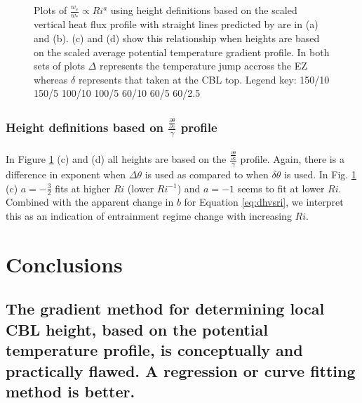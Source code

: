 \documentclass[referee]{svjour3}
\begin{document}
\begin{figure}[htbp]
\begin{minipage}[b]{0.5\linewidth}
        \end{minipage}
        \caption{Plots of $\frac{w_{e}}{w_{*}} \propto Ri^{a}$ using height definitions based on the scaled vertical heat flux profile with straight lines predicted by \cite{Garcia14} are in (a) and (b).  (c) and (d) show this relationship when heights are based on the scaled average potential temperature gradient profile. In both sets of plots $\Delta$ represents the temperature jump accross the EZ whereas $\delta$ represents that taken at the CBL top. Legend key:{\color{red} } 150/10  150/5 \hspace{2mm} {\color{black} } 100/10 \hspace{2mm} {\color{black} } 100/5 \hspace{2mm} {\color{offyellow} } 60/10 \hspace{2mm} {\color{offyellow} } 60/5 \hspace{2mm} {\color{offyellow} } 60/2.5}
        \label{fig:weinvri}
\end{figure}


\subsubsection{Height definitions based on $\frac{\frac{\partial \overline{\theta}}{\partial z}}{\gamma}$ profile}
In Figure \ref{fig:weinvri} (c) and (d) all heights are based on the $\frac{\frac{\partial \overline{\theta}}{\partial z}}{\gamma}$ profile.  Again, there is a difference in exponent when $\Delta \theta$ is used as compared to when $\delta \theta$ is used.  In Fig. \ref{fig:weinvri} (c) $a=-\frac{3}{2}$ fits at higher $Ri$ (lower $Ri^{-1}$) and $a=-1$ seems to fit at lower $Ri$.  Combined with the apparent change in $b$ for Equation \ref{eq:dhvsri}, we interpret this as an indication of entrainment regime change with increasing $Ri$.\\ 


\section{Conclusions}

\subsection{The gradient method for determining local CBL height, based on the potential temperature profile, is conceptually and practically flawed.  A regression or curve fitting method is better.}
\end{document}
